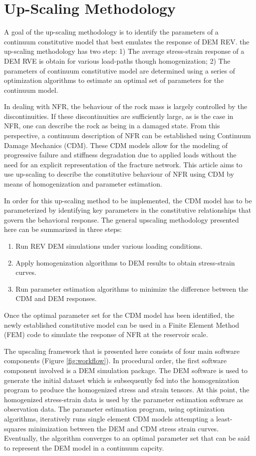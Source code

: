 \section{Up-Scaling Methodology}
A goal of the up-scaling methodology is to identify the parameters of a continuum constitutive model that best emulates the response of DEM REV. the up-scaling methodology has two step: 1) The average stress-strain response of a DEM RVE is obtain for various load-paths though homogenization; 2) The parameters of continuum constitutive model are determined using a series of optimization algorithms to estimate an optimal set of parameters for the continuum model.

In dealing with NFR, the behaviour of the rock mass is largely controlled by the discontinuities. If these discontinuities are sufficiently large, as is the case in NFR, one can describe the rock as being in a damaged state. From this perspective, a continuum description of NFR can be established using Continuum Damage Mechanics (CDM). These CDM models allow for the modeling of progressive failure and stiffness degradation due to applied loads without the need for an explicit representation of the fracture network. This article aims to use up-scaling to describe the constitutive behaviour of NFR using CDM by means of homogenization and parameter estimation. 

In order for this  up-scaling method to be implemented, the CDM model has to be parameterized by identifying key parameters in the constitutive relationships that govern the behavioral response. The general upscaling methodology presented here can be summarized in three steps:
\begin{enumerate}
	\item Run REV DEM simulations under various loading conditions.
	\item Apply homogenization algorithms to DEM results to obtain stress-strain curves.
	\item Run parameter estimation algorithms to minimize the difference between the CDM and DEM responses.
\end{enumerate}

Once the optimal parameter set for the CDM model has been identified, the newly established constitutive model can be used in a Finite Element Method (FEM) code to simulate the response of NFR at the reservoir scale.

The upscaling framework that is presented here consists of four main software components (Figure \ref{fig:workflow}). In procedural order, the first software component involved is a DEM simulation package. The DEM software is used to generate the initial dataset which is subsequently fed into the homogenization program to produce the homogenized stress and strain tensors. At this point, the homogenized stress-strain data is used by the parameter estimation software as observation data. The parameter estimation program, using optimization algorithms, iteratively runs single element CDM models attempting a least-squares minimization between the DEM and CDM stress strain curves. Eventually, the algorithm converges to an optimal parameter set that can be said to represent the DEM model in a continuum capcity.
